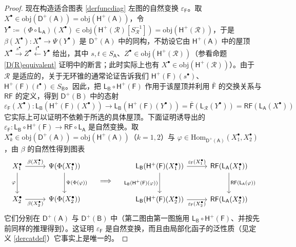 \begin{proof}
	现在构造适合图表 \eqref{derfuncdiag} 左图的自然变换 $\varepsilon_\mathsf{F}$。取 $X^\bullet\in\text{obj}(\mathsf{D^+(A)})=\text{obj}(\mathsf{H^+(A)})$，令 $Y^\bullet\coloneqq(\Phi\circ\mathsf{L_A})(X^\bullet)\in\text{obj}(\mathsf{H^+(\mathcal{R})}[S_\mathcal{R}^{-1}])=\text{obj}(\mathsf{H^+(\mathcal{R})})$，于是 $\beta({X^\bullet}):X^\bullet\rightarrow\Psi(Y^\bullet)$ 是 $\mathsf{D^+(A)}$ 中的同构，不妨设它由 $\mathsf{H^+(A)}$ 中的屋顶 $X^\bullet\xrightarrow{s^\bullet} Z^\bullet\xleftarrow{t^\bullet} Y^\bullet$ 给出，其中 $s,t\in S_\mathsf{A}$、$Z^\bullet\in\text{obj}(\mathsf{H^+(\mathcal{R})})$（参看命题 \ref{D(R)equivalent} 证明中的断言；此时实际上也有 $X^\bullet\in\text{obj}(\mathsf{H^+(\mathcal{R})})$）。由于 $\mathcal{R}$ 是适应的，关于无环锥的通常论证告诉我们 $\mathsf{H^+(F)}(s^\bullet)$、$\mathsf{H^+(F)}(t^\bullet)\in S_\mathsf{B}$。因此，把 $\mathsf{L_B}\circ\mathsf{H^+(F)}$ 作用于该屋顶并利用 $\bar{\mathsf{F}}$ 的交换关系与 $\mathsf{RF}$ 的定义，得到 $\mathsf{D^+(B)}$ 中的态射
	\[
	\varepsilon_\mathsf{F}(X^\bullet):\mathsf{L_B}(\mathsf{H^+(F)}(X^\bullet))\rightarrow\mathsf{L_B}(\mathsf{H^+(F)}(Y^\bullet))=\bar{\mathsf{F}}(\mathsf{L_\mathcal{R}}(Y^\bullet))=\mathsf{RF}(\mathsf{L_A}(X^\bullet))
	\]
	它实际上可以证明不依赖于所选的具体屋顶。下面证明诱导出的 $\varepsilon_\mathsf{F}:\mathsf{L_B}\circ\mathsf{H^+(F)}\rightarrow\mathsf{RF}\circ\mathsf{L_A}$ 是自然变换。取 $X_k^\bullet\in\text{obj}(\mathsf{D^+(A)})=\text{obj}(\mathsf{H^+(A)})$（$k=1,2$）与 $\varphi\in\text{Hom}_\mathsf{D^+(A)}(X_1^\bullet,X_2^\bullet)$，由 $\beta$ 的自然性得到图表
	\[
	\begin{tikzcd}[column sep=1cm, row sep=1cm]
		X_1^\bullet\arrow[r, "\beta(X_1^\bullet)"]\arrow[d, "\varphi"'] & \Psi(\Phi(X_1^\bullet))\arrow[d, "\Psi(\Phi(\varphi))"] \\
		X_2^\bullet\arrow[r, "\beta(X_2^\bullet)"'] & \Psi(\Phi(X_2^\bullet))
	\end{tikzcd}\quad\implies\quad
	\begin{tikzcd}[column sep=1cm, row sep=1cm]
		\mathsf{L_B}(\mathsf{H^+(F)}(X_1^\bullet))\arrow[r, "\varepsilon_\mathsf{F}(X_1^\bullet)"]\arrow[d, "\mathsf{L_B}(\mathsf{H^+(F)}(\varphi))"'] & \mathsf{RF}(\mathsf{L_A}(X_1^\bullet))\arrow[d, "\mathsf{RF}(\mathsf{L_A}(\varphi))"] \\
		\mathsf{L_B}(\mathsf{H^+(F)}(X_2^\bullet))\arrow[r, "\varepsilon_\mathsf{F}(X_2^\bullet)"'] & \mathsf{RF}(\mathsf{L_A}(X_2^\bullet))
	\end{tikzcd}
	\]
	它们分别在 $\mathsf{D^+(A)}$ 与 $\mathsf{D^+(B)}$ 中（第二图由第一图施用 $\mathsf{L_B}\circ\mathsf{H^+(F)}$、并按先前同样的推理得到）。这证明 $\varepsilon_\mathsf{F}$ 是自然变换，而且由局部化函子的泛性质（见定义 \ref{dercatdef}）它事实上是唯一的。
	

\end{proof}
